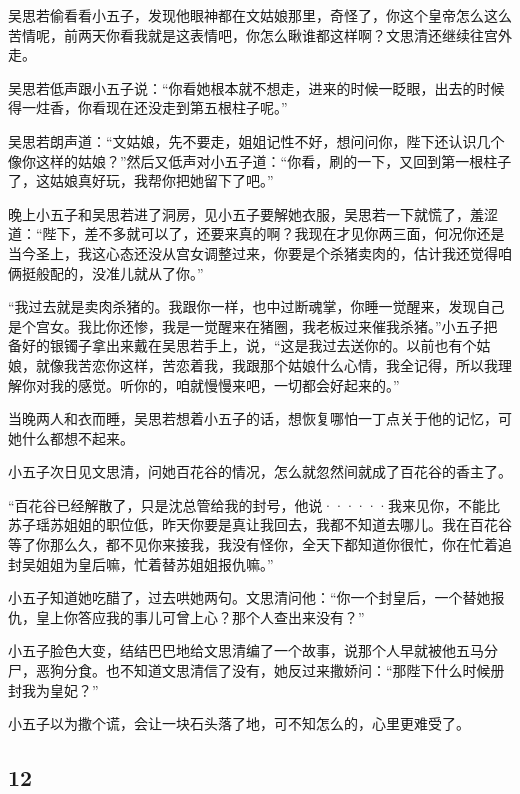 吴思若偷看看小五子，发现他眼神都在文姑娘那里，奇怪了，你这个皇帝怎么这么苦情呢，前两天你看我就是这表情吧，你怎么瞅谁都这样啊？文思清还继续往宫外走。

吴思若低声跟小五子说：“你看她根本就不想走，进来的时候一眨眼，出去的时候得一炷香，你看现在还没走到第五根柱子呢。”

吴思若朗声道：“文姑娘，先不要走，姐姐记性不好，想问问你，陛下还认识几个像你这样的姑娘？”然后又低声对小五子道：“你看，刷的一下，又回到第一根柱子了，这姑娘真好玩，我帮你把她留下了吧。”
\newline

晚上小五子和吴思若进了洞房，见小五子要解她衣服，吴思若一下就慌了，羞涩道：“陛下，差不多就可以了，还要来真的啊？我现在才见你两三面，何况你还是当今圣上，我这心态还没从宫女调整过来，你要是个杀猪卖肉的，估计我还觉得咱俩挺般配的，没准儿就从了你。”

“我过去就是卖肉杀猪的。我跟你一样，也中过断魂掌，你睡一觉醒来，发现自己是个宫女。我比你还惨，我是一觉醒来在猪圈，我老板过来催我杀猪。”小五子把
备好的银镯子拿出来戴在吴思若手上，说，“这是我过去送你的。以前也有个姑娘，就像我苦恋你这样，苦恋着我，我跟那个姑娘什么心情，我全记得，所以我理解你对我的感觉。听你的，咱就慢慢来吧，一切都会好起来的。”

当晚两人和衣而睡，吴思若想着小五子的话，想恢复哪怕一丁点关于他的记忆，可她什么都想不起来。
\newline

小五子次日见文思清，问她百花谷的情况，怎么就忽然间就成了百花谷的香主了。

“百花谷已经解散了，只是沈总管给我的封号，他说······我来见你，不能比苏子瑶苏姐姐的职位低，昨天你要是真让我回去，我都不知道去哪儿。我在百花谷等了你那么久，都不见你来接我，我没有怪你，全天下都知道你很忙，你在忙着追封吴姐姐为皇后嘛，忙着替苏姐姐报仇嘛。”

小五子知道她吃醋了，过去哄她两句。文思清问他：“你一个封皇后，一个替她报仇，皇上你答应我的事儿可曾上心？那个人查出来没有？”

小五子脸色大变，结结巴巴地给文思清编了一个故事，说那个人早就被他五马分尸，恶狗分食。也不知道文思清信了没有，她反过来撒娇问：“那陛下什么时候册封我为皇妃？”

小五子以为撒个谎，会让一块石头落了地，可不知怎么的，心里更难受了。
\newline

{\centering\subsection{12}}

